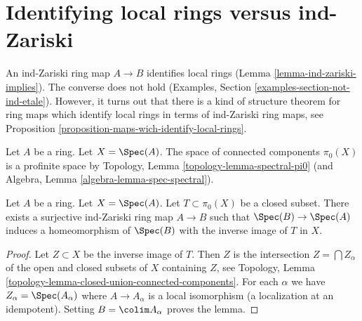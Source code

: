 %

\section{Identifying local rings versus ind-Zariski}
\label{section-connected-components}

\noindent
An ind-Zariski ring map $A \to B$ identifies local rings
(Lemma \ref{lemma-ind-zariski-implies}). The converse does not hold
(Examples, Section \ref{examples-section-not-ind-etale}).
However, it turns out that there is a kind of structure theorem for
ring maps which identify local rings in terms of ind-Zariski
ring maps, see Proposition \ref{proposition-maps-wich-identify-local-rings}.

\medskip\noindent
Let $A$ be a ring. Let $X = \Spec(A)$. The space of connected
components $\pi_0(X)$ is a profinite space by
Topology, Lemma \ref{topology-lemma-spectral-pi0}
(and Algebra, Lemma \ref{algebra-lemma-spec-spectral}).

\begin{lemma}
\label{lemma-construct}
Let $A$ be a ring. Let $X = \Spec(A)$. Let $T \subset \pi_0(X)$ be a
closed subset. There exists a surjective ind-Zariski ring map $A \to B$
such that $\Spec(B) \to \Spec(A)$ induces a homeomorphism of $\Spec(B)$
with the inverse image of $T$ in $X$.
\end{lemma}

\begin{proof}
Let $Z \subset X$ be the inverse image of $T$. Then $Z$ is the intersection
$Z = \bigcap Z_\alpha$ of the open and closed subsets of $X$ containing $Z$,
see Topology, Lemma \ref{topology-lemma-closed-union-connected-components}.
For each $\alpha$ we have $Z_\alpha = \Spec(A_\alpha)$ where
$A \to A_\alpha$ is a local isomorphism (a localization at an idempotent).
Setting $B = \colim A_\alpha$ proves the lemma.
\end{proof}

